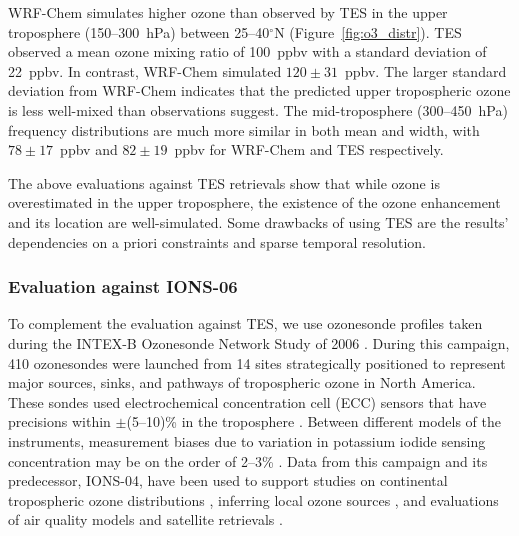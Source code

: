 WRF-Chem simulates higher ozone than observed by
TES in the upper troposphere (150--300~hPa) between 25--40$^\circ$N (Figure~\ref{fig:o3_distr}). TES observed a mean ozone
mixing ratio of 100~ppbv with a standard deviation of 22~ppbv. In contrast, WRF-Chem
simulated $120\pm31$~ppbv. The larger standard deviation from WRF-Chem indicates that
the predicted upper tropospheric ozone is less well-mixed than observations suggest.
The mid-troposphere (300--450~hPa) frequency distributions are much more similar in both mean
and width, with $78\pm17$~ppbv and $82\pm19$~ppbv for WRF-Chem and TES
respectively.

The above evaluations against TES retrievals show that while ozone is overestimated in the upper
troposphere, the existence of the ozone enhancement and its location are well-simulated.
Some drawbacks of using TES are the results' dependencies on a priori constraints and sparse
temporal resolution.



\subsubsection{Evaluation against IONS-06}

To complement the evaluation against TES, we use ozonesonde
profiles taken during the INTEX-B Ozonesonde Network Study of 2006
\citep[IONS-06;][]{Thompson:2008rp}. During this campaign, 410 ozonesondes were
launched from 14 sites strategically positioned to represent major sources, sinks, and
pathways of tropospheric ozone in North America. These sondes used electrochemical
concentration cell (ECC) sensors that have precisions within $\pm$(5--10)\% in the
troposphere \citep{Smit:2007ta}. Between different models of the instruments,
measurement biases due to variation in potassium iodide sensing concentration may be
on the order of 2--3\% \citep{Smit:2007ta}. Data from this campaign and its predecessor,
IONS-04, have been used to support studies on continental tropospheric ozone
distributions \citep[e.g.][]{Cooper:2007cr}, inferring local ozone sources
\citep[e.g.][]{Thompson:2008rp}, and evaluations of air quality models
\citep[e.g.][]{Tarasick:2007dq} and satellite retrievals \citep[e.g.][]{Nassar:2008mw}.

